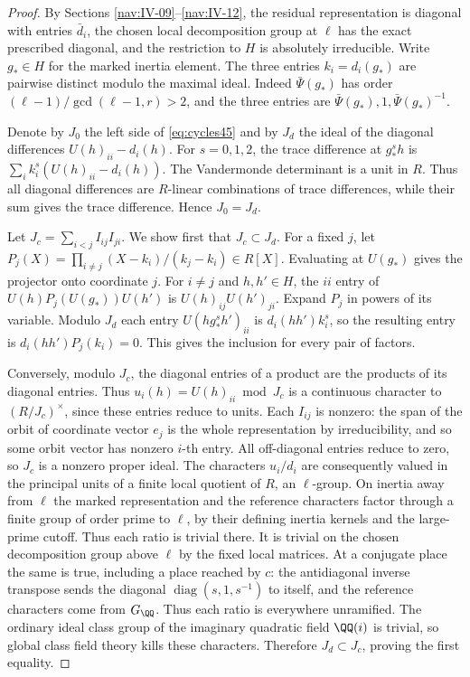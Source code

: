 \documentclass[a4paper,11pt]{article}
\theoremstyle{definition}
\theoremstyle{remark}
\numberwithin{equation}{section}
\begin{document}
\begin{proof}
By Sections \ref{nav:IV-09}--\ref{nav:IV-12}, the residual representation is diagonal with entries \(\bar d_i\), the chosen local decomposition group at \(\ell\) has the exact prescribed diagonal, and the restriction to \(H\) is absolutely irreducible. Write \(g_*\in H\) for the marked inertia element. The three entries \(k_i=d_i(g_*)\) are pairwise distinct modulo the maximal ideal. Indeed \(\bar\Psi(g_*)\) has order \((\ell-1)/\gcd(\ell-1,r)>2\), and the three entries are \(\bar\Psi(g_*),1,\bar\Psi(g_*)^{-1}\).

Denote by \(J_0\) the left side of \eqref{eq:cycles45} and by \(J_d\) the ideal of the diagonal differences \(U(h)_{ii}-d_i(h)\). For \(s=0,1,2\), the trace difference at \(g_*^s h\) is \(\sum_i k_i^s(U(h)_{ii}-d_i(h))\). The Vandermonde determinant is a unit in \(R\). Thus all diagonal differences are \(R\)-linear combinations of trace differences, while their sum gives the trace difference. Hence \(J_0=J_d\).

Let \(J_c=\sum_{i<j}I_{ij}I_{ji}\). We show first that \(J_c\subset J_d\). For a fixed \(j\), let \(P_j(X)=\prod_{i\ne j}(X-k_i)/(k_j-k_i)\in R[X]\). Evaluating at \(U(g_*)\) gives the projector onto coordinate \(j\). For \(i\ne j\) and \(h,h'\in H\), the \(ii\) entry of \(U(h)P_j(U(g_*))U(h')\) is \(U(h)_{ij}U(h')_{ji}\). Expand \(P_j\) in powers of its variable. Modulo \(J_d\) each entry \(U(hg_*^s h')_{ii}\) is \(d_i(hh')k_i^s\), so the resulting entry is \(d_i(hh')P_j(k_i)=0\). This gives the inclusion for every pair of factors.

Conversely, modulo \(J_c\), the diagonal entries of a product are the products of its diagonal entries. Thus \(u_i(h)=U(h)_{ii}\bmod J_c\) is a continuous character to \((R/J_c)^\times\), since these entries reduce to units. Each \(I_{ij}\) is nonzero: the span of the orbit of coordinate vector \(e_j\) is the whole representation by irreducibility, and so some orbit vector has nonzero \(i\)-th entry. All off-diagonal entries reduce to zero, so \(J_c\) is a nonzero proper ideal. The characters \(u_i/d_i\) are consequently valued in the principal units of a finite local quotient of \(R\), an \(\ell\)-group. On inertia away from \(\ell\) the marked representation and the reference characters factor through a finite group of order prime to \(\ell\), by their defining inertia kernels and the large-prime cutoff. Thus each ratio is trivial there. It is trivial on the chosen decomposition group above \(\ell\) by the fixed local matrices. At a conjugate place the same is true, including a place reached by \(c\): the antidiagonal inverse transpose sends the diagonal \(\operatorname{diag}(s,1,s^{-1})\) to itself, and the reference characters come from \(G_\QQ\). Thus each ratio is everywhere unramified. The ordinary ideal class group of the imaginary quadratic field \(\QQ(i)\) is trivial, so global class field theory kills these characters. Therefore \(J_d\subset J_c\), proving the first equality.


\end{proof}
\end{document}
